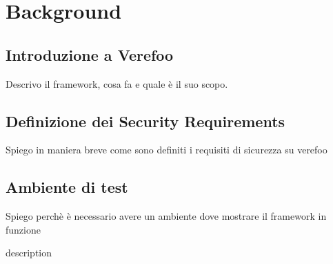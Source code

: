 \chapter{Background} \label{ch:verefoo}

\section{Introduzione a Verefoo} 

Descrivo il framework, cosa fa e quale è il suo scopo.

\section{Definizione dei Security Requirements}

Spiego in maniera breve come sono definiti i requisiti di sicurezza su verefoo

\section{Ambiente di test}

Spiego perchè è necessario avere un ambiente dove mostrare il framework in funzione


description \cite{noms2020}